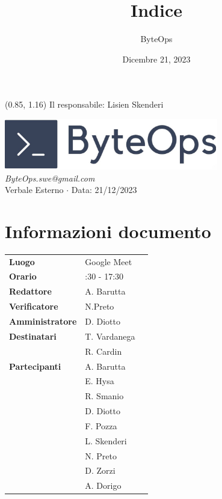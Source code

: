 \documentclass{article}
\title{\textbf{\fontsize{28}{6}\selectfont Indice}}
\author{\fontsize{14}{6}\selectfont ByteOps}
\date{Dicembre 21, 2023}
\begin{document}
\begin{textblock*}{\textwidth}(0.85\textwidth, 1.16\textheight)
    Il responsabile: Lisien Skenderi
\end{textblock*}

\pagestyle{fancy}
\begin{center}
\includegraphics[width = 0.7\textwidth]{../../../Images/logo.png} \\
\vspace{0.2cm}
\textcolor[RGB]{60, 60, 60}{\textit{ByteOps.swe@gmail.com}} \\
\vspace{1cm}
\fontsize{16}{6}\selectfont Verbale Esterno $\cdot$ Data: 21/12/2023 \\
\vspace{0.5cm}
\end{center}

\section*{Informazioni documento}
\def\arraystretch{1.2}
\begin{tabular}{>{\raggedleft\arraybackslash}p{}|>{\raggedright\arraybackslash}p{}c}
\hline
\addlinespace
\textbf{Luogo} & Google Meet \vspace{10pt} \\
\textbf{Orario} & 16:30 - 17:30 \vspace{10pt} \\
\textbf{Redattore} & A. Barutta \vspace{10pt} \\
\textbf{Verificatore} & N.Preto \vspace{10pt} \\
\textbf{Amministratore} & D. Diotto \vspace{10pt} \\
\textbf{Destinatari} & T. Vardanega \\ & R. Cardin \vspace{10pt} \\
\textbf{Partecipanti} & A. Barutta \\ & E. Hysa \\ & R. Smanio \\ & D. Diotto \\ & F. Pozza \\ & L. Skenderi \\ & N. Preto \\ & D. Zorzi \\ & A. Dorigo \vspace{10pt}
\end{tabular}
\pagebreak 
\end{document}
